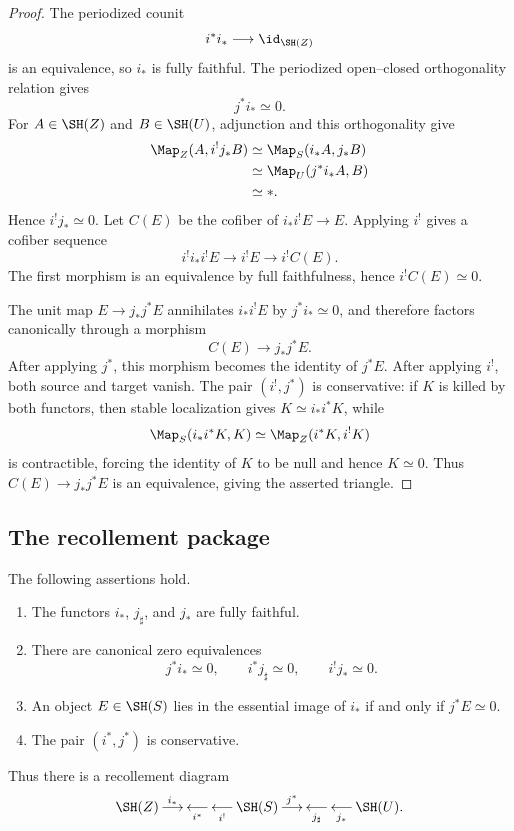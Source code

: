 \begin{proof}
The periodized counit
\[
    i^*i_*\longrightarrow\id_{\SH(Z)}
\]
is an equivalence, so $i_*$ is fully faithful.  The periodized open--closed orthogonality relation
gives
\[
    j^*i_*\simeq0.
\]
For $A\in\SH(Z)$ and $B\in\SH(U)$, adjunction and this orthogonality give
\[
\begin{aligned}
    \Map_Z(A,i^!j_*B)
    &\simeq
    \Map_S(i_*A,j_*B) \\
    &\simeq
    \Map_U(j^*i_*A,B) \\
    &\simeq *.
\end{aligned}
\]
Hence $i^!j_*\simeq0$.  Let $C(E)$ be the cofiber of $i_*i^!E\to E$.  Applying $i^!$ gives a
cofiber sequence
\[
    i^!i_*i^!E
    \longrightarrow
    i^!E
    \longrightarrow
    i^!C(E).
\]
The first morphism is an equivalence by full faithfulness, hence $i^!C(E)\simeq0$.

The unit map $E\to j_*j^*E$ annihilates $i_*i^!E$ by $j^*i_*\simeq0$, and therefore factors
canonically through a morphism
\[
    C(E)\longrightarrow j_*j^*E.
\]
After applying $j^*$, this morphism becomes the identity of $j^*E$.  After applying $i^!$, both
source and target vanish.  The pair $(i^!,j^*)$ is conservative: if $K$ is killed by both functors,
then stable localization gives $K\simeq i_*i^*K$, while
\[
    \Map_S(i_*i^*K,K)
    \simeq
    \Map_Z(i^*K,i^!K)
\]
is contractible, forcing the identity of $K$ to be null and hence $K\simeq0$.  Thus
$C(E)\to j_*j^*E$ is an equivalence, giving the asserted triangle.
\end{proof}

\subsection{The recollement package}

\begin{proposition}
\label{prop:stable-recollement}
The following assertions hold.
\begin{enumerate}
    \item The functors $i_*$, $j_\sharp$, and $j_*$ are fully faithful.

    \item There are canonical zero equivalences
    \[
        j^*i_*\simeq0,
        \qquad
        i^*j_\sharp\simeq0,
        \qquad
        i^!j_*\simeq0.
    \]

    \item An object $E\in\SH(S)$ lies in the essential image of $i_*$ if and only if
    $j^*E\simeq0$.

    \item The pair $(i^*,j^*)$ is conservative.
\end{enumerate}
Thus there is a recollement diagram
\[
    \SH(Z)
    \mathop{\longrightarrow}^{i_*}
    \mathop{\longleftarrow}_{i^*}
    \mathop{\longleftarrow}_{i^!}
    \SH(S)
    \mathop{\longrightarrow}^{j^*}
    \mathop{\longleftarrow}_{j_\sharp}
    \mathop{\longleftarrow}_{j_*}
    \SH(U).
\]
\end{proposition}

